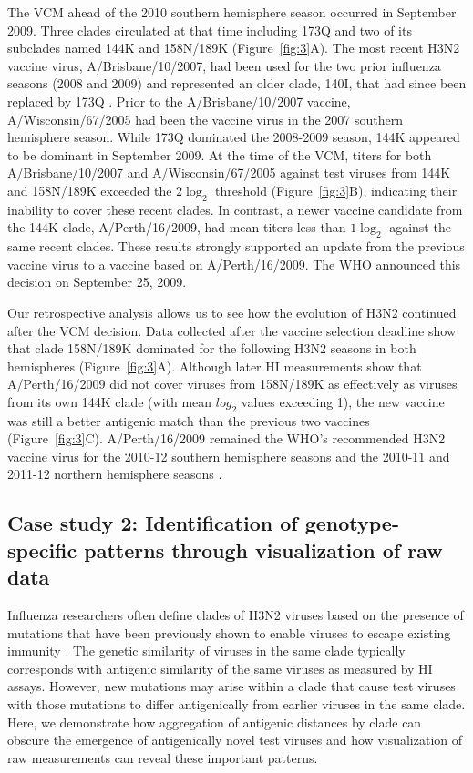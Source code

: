 \documentclass[utf8]{FrontiersinHarvard} %
\begin{document}
The VCM ahead of the 2010 southern hemisphere season occurred in September 2009.
Three clades circulated at that time including 173Q and two of its subclades named 144K and 158N/189K (Figure~\ref{fig:3}A).
The most recent H3N2 vaccine virus, A/Brisbane/10/2007, had been used for the two prior influenza seasons (2008 and 2009) and represented an older clade, 140I, that had since been replaced by 173Q \citep{WHO:archive}.
Prior to the A/Brisbane/10/2007 vaccine, A/Wisconsin/67/2005 had been the vaccine virus in the 2007 southern hemisphere season.
While 173Q dominated the 2008-2009 season, 144K appeared to be dominant in September 2009.
At the time of the VCM, titers for both A/Brisbane/10/2007 and A/Wisconsin/67/2005 against test viruses from 144K and 158N/189K exceeded the $2\log_{2}$ threshold (Figure~\ref{fig:3}B), indicating their inability to cover these recent clades.
In contrast, a newer vaccine candidate from the 144K clade, A/Perth/16/2009, had mean titers less than $1\log_{2}$ against the same recent clades.
These results strongly supported an update from the previous vaccine virus to a vaccine based on A/Perth/16/2009.
The WHO announced this decision on September 25, 2009.

Our retrospective analysis allows us to see how the evolution of H3N2 continued after the VCM decision.
Data collected after the vaccine selection deadline show that clade 158N/189K dominated for the following H3N2 seasons in both hemispheres (Figure~\ref{fig:3}A).
Although later HI measurements show that A/Perth/16/2009 did not cover viruses from 158N/189K as effectively as viruses from its own 144K clade (with mean $log_{2}$ values exceeding 1), the new vaccine was still a better antigenic match than the previous two vaccines (Figure~\ref{fig:3}C).
A/Perth/16/2009 remained the WHO's recommended H3N2 vaccine virus for the 2010-12 southern hemisphere seasons and the 2010-11 and 2011-12 northern hemisphere seasons \citep{WHO:recent}.

\subsection{Case study 2: Identification of genotype-specific patterns through visualization of raw data}

Influenza researchers often define clades of H3N2 viruses based on the presence of mutations that have been previously shown to enable viruses to escape existing immunity \citep{Wolf:2006da,Shih:2007bd,Koel:2013jz}.
The genetic similarity of viruses in the same clade typically corresponds with antigenic similarity of the same viruses as measured by HI assays.
However, new mutations may arise within a clade that cause test viruses with those mutations to differ antigenically from earlier viruses in the same clade.
Here, we demonstrate how aggregation of antigenic distances by clade can obscure the emergence of antigenically novel test viruses and how visualization of raw measurements can reveal these important patterns.
\end{document}
